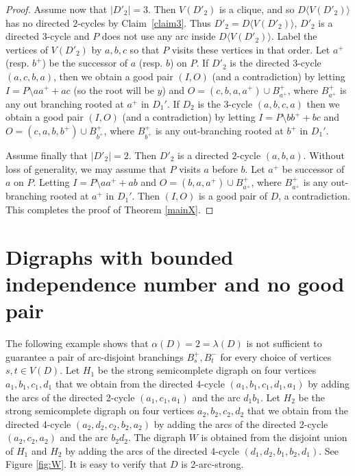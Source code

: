 \documentclass{article}
\theoremstyle{definition}
\newcommand{\2}{\vspace{0.2cm}}
\begin{document}
\begin{proof}
\medskip

Assume now that $|D'_2|=3$. Then $V(D'_2)$ is a clique, and so
$D\langle V(D'_2)\rangle$ has no directed $2$-cycles by
Claim~\ref{claim3}. Thus $D'_2=D\langle V(D'_2)\rangle$, $D'_2$ is a
directed 3-cycle and $P$ does not use any arc inside $D\langle
V(D'_2)\rangle$. Label the vertices of $V(D'_2)$ by $a,b,c$ so that
$P$ visits these vertices in that order. Let $a^+$ (resp. $b^+$) be
the successor of $a$ (resp. $b$) on $P$.  If $D'_2$ is the directed
3-cycle $(a,c,b,a)$, then we obtain a good pair $(I,O)$ (and a
contradiction) by letting $I=P\setminus aa^++ac$ (so the root will be
$y$) and $O=(c,b,a,a^+)\cup B^+_{a^+}$, where $B^+_{a^+}$ is any out
branching rooted at $a^+$ in $D_1'$.  If $D_2$ is the 3-cycle $(a,b,c,a)$
then we obtain a good pair $(I,O)$ (and a contradiction) by letting
$I=P\setminus bb^+ +bc$ and $O=(c,a,b,b^+)\cup B^+_{b^+}$, where
$B^+_{b^+}$ is any out-branching rooted at $b^+$ in $D_1'$.

\medskip

Assume finally that $|D'_2|=2$.  Then $D'_2$ is a directed $2$-cycle
$(a,b,a)$.  Without loss of generality, we may assume that $P$ visits
$a$ before $b$.  Let $a^+$ be successor of $a$ on $P$.  Letting
$I=P\setminus aa^+ +ab$ and $O=(b,a,a^+)\cup B^+_{a^+}$, where
$B^+_{a^+}$ is any out-branching rooted at $a^+$ in $D_1'$.  Then
$(I,O)$ is a good pair of $D$, a contradiction.  This completes the
proof of Theorem \ref{mainX}.
\end{proof}


\section{Digraphs with bounded independence number  and no good pair}

The following example shows that $\alpha(D)=2=\lambda{}(D)$ is not
sufficient to guarantee a pair of arc-disjoint branchings
$B_s^+,B_t^-$ for every choice of vertices $s,t\in V(D)$.  Let $H_1$
be the strong semicomplete digraph on four vertices $a_1,b_1,c_1,d_1$
that we obtain from the directed 4-cycle $(a_1,b_1,c_1,d_1,a_1)$ by adding the arcs
of the directed 2-cycle $(a_1,c_1,a_1)$ and the arc $d_1b_1$. Let $H_2$ be the
strong semicomplete digraph on four vertices $a_2,b_2,c_2,d_2$ that we
obtain from the directed 4-cycle $(a_2,d_2,c_2,b_2,a_2)$ by adding the arcs of the
directed 2-cycle $(a_2,c_2,a_2)$ and the arc $b_2d_2$. The digraph $W$ is obtained
from the disjoint union of $H_1$ and $H_2$ by adding the arcs of the directed 4-cycle $(d_1,d_2,b_1,b_2,d_1)$. See
Figure \ref{fig:W}. It is easy to verify that $D$ is 2-arc-strong.
\end{document}
